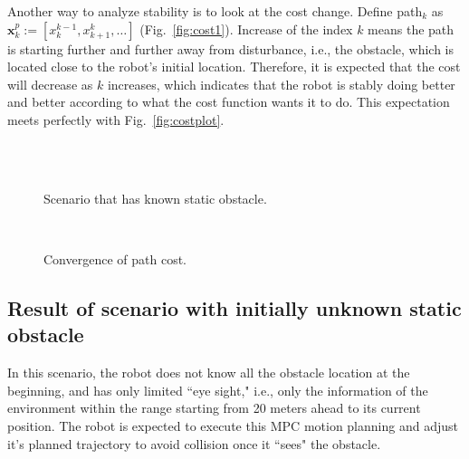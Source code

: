 \documentclass[letterpaper, 10 pt, conference]{ieeeconf}  %
\begin{document}
Another way to analyze stability is to look at the cost change. Define path$_k$ as $\mathbf{x}_{k}^{p} := [x_{k}^{k-1},x_{k+1}^{k},\ldots]$ (Fig.~\ref{fig:cost1}). Increase of the index $k$ means the path is starting further and further away from disturbance, i.e., the obstacle, which is located close to the robot's initial location. Therefore, it is expected that the cost will decrease as $k$ increases, which indicates that the robot is stably doing better and better according to what the cost function wants it to do. This expectation meets perfectly with Fig.~\ref{fig:costplot}. 


\begin{figure}[t]
      \centering
      \\
      \\
      
      \caption{Scenario that has known static obstacle.}
      
\end{figure}



\begin{figure}[t]
      \centering
      \\
      
      \caption{Convergence of path cost.}
      
\end{figure}



\subsection{Result of scenario with initially unknown static obstacle}
In this scenario, the robot does not know all the obstacle location at the beginning, and has only limited ``eye sight," i.e., only the information of the environment within the range starting from 20 meters ahead to its current position. The robot is expected to execute this MPC motion planning and adjust it's planned trajectory to avoid collision once it ``sees" the obstacle.
\end{document}
